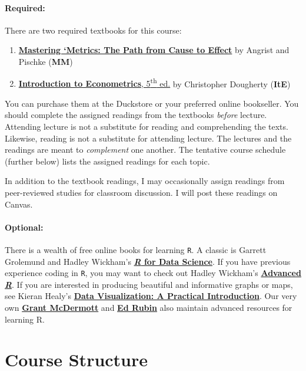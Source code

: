 \documentclass[10pt]{article}
\begin{document}
\paragraph{Required:} There are two required textbooks for this course:

\begin{enumerate}
	\item \href{https://www.amazon.com/Mastering-Metrics-Path-Cause-Effect/dp/0691152845/}{\textbf{Mastering `Metrics: The Path from Cause to Effect}} by Angrist and Pischke (\textbf{MM})
	\item \href{http://www.amazon.com/Introduction-Econometrics-Christopher-Dougherty/dp/0199676828/}{\textbf{Introduction to Econometrics}, 5\textsuperscript{th} ed.} by Christopher Dougherty (\textbf{ItE})
\end{enumerate}
You can purchase them at the Duckstore or your preferred online bookseller. You should complete the assigned readings from the textbooks \textit{before} lecture. Attending lecture is not a substitute for reading and comprehending the texts. Likewise, reading is not a substitute for attending lecture. The lectures and the readings are meant to \textit{complement} one another. The tentative course schedule (further below) lists the assigned readings for each topic.

In addition to the textbook readings, I may occasionally assign readings from peer-reviewed studies for classroom discussion. I will post these readings on Canvas.

\paragraph{Optional:} 
There is a wealth of free online books for learning \texttt{R}. 
A classic is Garrett Grolemund and Hadley Wickham's \href{http://r4ds.had.co.nz}{\textbf{\textit{R} for Data Science}}. 
If you have previous experience coding in \texttt{R}, you may want to check out Hadley Wickham's \href{http://adv-r.had.co.nz/}{\textbf{Advanced \textit{R}}}. 
If you are interested in producing beautiful and informative graphs or maps, see Kieran Healy's \href{http://socviz.co/}{\textbf{Data Visualization: A Practical Introduction}}. 
Our very own \href{https://grantmcdermott.com/teaching/}{\textbf{Grant McDermott}} and \href{http://edrub.in/teaching.html}{\textbf{Ed Rubin}} also maintain advanced resources for learning R.

\newpage
\section*{Course Structure}
\end{document}
